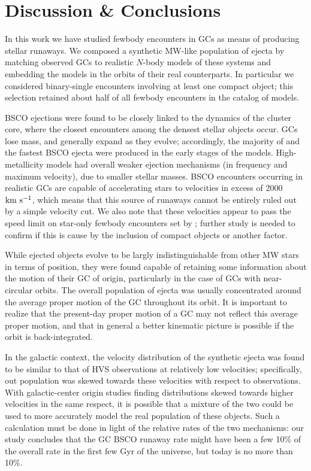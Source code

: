 \documentclass[twocolumn]{aastex631}
\newcommand{\kms}{${\rm km~s^{-1}}$}
\begin{document}
\section{Discussion \& Conclusions} \label{sec:disccon}

In this work we have studied fewbody encounters in GCs as means of producing stellar runaways.
We composed a synthetic MW-like population of ejecta by matching observed GCs to realistic $N$-body models of these systems and embedding the models in the orbits of their real counterparts.
In particular we considered binary-single encounters involving at least one compact object; this selection retained about half of all fewbody encounters in the catalog of models.

BSCO ejections were found to be closely linked to the dynamics of the cluster core, where the closest encounters among the densest stellar objects occur.
GCs lose mass, and generally expand as they evolve; accordingly, the majority of and the fastest BSCO ejecta were produced in the early stages of the models.
High-metallicity models had overall weaker ejection mechanisms (in frequency and maximum velocity), due to smaller stellar masses.
BSCO encounters occurring in realistic GCs are capable of accelerating stars to velocities in excess of 2000 \kms, which means that this source of runaways cannot be entirely ruled out by a simple velocity cut.
We also note that these velocities appear to pass the speed limit on star-only fewbody encounters set by \citet{1991AJ....101..562L}; further study is needed to confirm if this is cause by the inclusion of compact objects or another factor.

While ejected objects evolve to be largly indistinguishable from other MW stars in terms of position, they were found capable of retaining some information about the motion of their GC of origin, particularly in the case of GCs with near-circular orbits.
The overall population of ejecta was usually concentrated around the average proper motion of the GC throughout its orbit.
It is important to realize that the present-day proper motion of a GC may not reflect this average proper motion, and that in general a better kinematic picture is possible if the orbit is back-integrated.

In the galactic context, the velocity distribution of the synthetic ejecta was found to be similar to that of HVS observations at relatively low velocities; specifically, out population was skewed towards these velocities with respect to observations.
With galactic-center origin studies finding distributions skewed towards higher velocities in the same respect, it is possible that a mixture of the two could be used to more accurately model the real population of these objects.
Such a calculation must be done in light of the relative rates of the two mechanisms: our study concludes that the GC BSCO runaway rate might have been a few 10\% of the overall rate in the first few Gyr of the universe, but today is no more than 10\%.
\end{document}
